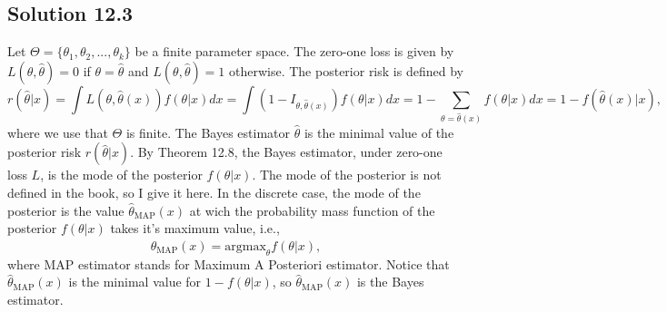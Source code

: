 \subsection*{Solution 12.3}

Let $\Theta = \{\theta_1, \theta_2, ..., \theta_k\}$ be a finite parameter space.
The zero-one loss is given by $L(\theta, \hat{\theta}) = 0$ if $\theta = \hat{\theta}$ and $L(\theta, \hat{\theta}) = 1$ otherwise.
The posterior risk is defined by
\begin{equation*}
    r(\hat{\theta}|x) = \int L(\theta, \hat{\theta}(x)) f(\theta|x) dx
        = \int \left(1 - I_{\theta, \hat{\theta}(x)}\right) f(\theta|x) dx
        = 1 - \sum_{\theta = \hat{\theta}(x)} f(\theta|x) dx
        = 1 - f(\hat{\theta}(x)|x),
\end{equation*}
where we use that $\Theta$ is finite.
The Bayes estimator $\hat{\theta}$ is the minimal value of the posterior risk $r(\hat{\theta}|x)$.
By Theorem 12.8, the Bayes estimator, under zero-one loss $L$, is the mode of the posterior $f(\theta|x)$.
The mode of the posterior is not defined in the book, so I give it here.
In the discrete case, the mode of the posterior is the value $\hat{\theta}_{\mathrm{MAP}}(x)$ at wich the probability mass function of the posterior $f(\theta|x)$ takes it's maximum value, i.e.,
\begin{equation*}
    \hat{\theta}_{\mathrm{MAP}}(x) = \mathrm{argmax}_{\theta} f(\theta|x),
\end{equation*}
where MAP estimator stands for Maximum A Posteriori estimator.
Notice that $\hat{\theta}_{\mathrm{MAP}}(x)$ is the minimal value for $1 - f(\theta|x)$, so $\hat{\theta}_{\mathrm{MAP}}(x)$ is the Bayes estimator.
